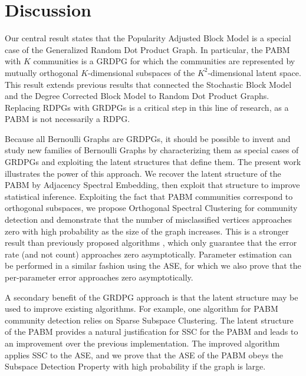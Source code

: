 \documentclass[12pt]{article}
\begin{document}
\hypertarget{discussion}{%
\section{Discussion}\label{discussion}}

Our central result states that the Popularity Adjusted Block Model 
is a special case of the Generalized Random Dot Product Graph. 
In particular, the PABM with $K$ communities is a GRDPG 
for which the communities are represented by 
mutually orthogonal $K$-dimensional subspaces 
of the $K^2$-dimensional latent space. 
This result extends previous results that connected 
the Stochastic Block Model and the Degree Corrected Block Model 
to Random Dot Product Graphs. 
Replacing RDPGs with GRDPGs is a critical step in this line of research, 
as a PABM is not necessarily a RDPG. 

Because all Bernoulli Graphs are GRDPGs, it should be possible to
invent and study new families of Bernoulli Graphs by characterizing
them as special cases of GRDPGs and exploiting the latent structures
that define them.  The present work illustrates the power of this
approach.  We recover the latent structure of the PABM by Adjacency
Spectral Embedding, then exploit that structure to improve statistical
inference.  Exploiting the fact that PABM communities correspond to
orthogonal subspaces, we propose Orthogonal Spectral Clustering for
community detection and demonstrate that the number of misclassified
vertices approaches zero with high probability as the size of the
graph increases.  This is a stronger result than previously proposed
algorithms \citep{307cbeb9b1be48299388437423d94bf1}, which only
guarantee that the error rate (and not count) approaches zero
asymptotically.  Parameter estimation can be performed in a similar
fashion using the ASE, for which we also prove that the per-parameter
error approaches zero asymptotically.

A secondary benefit of the GRDPG approach is that the latent structure
may be used to improve existing algorithms.  For example, one
algorithm for PABM community detection \citep{noroozi2019estimation}
relies on Sparse Subspace Clustering.  The latent structure of the
PABM provides a natural justification for SSC for the PABM and leads
to an improvement over the previous implementation.  The improved
algorithm applies SSC to the ASE, and we prove that the ASE of the
PABM obeys the Subspace Detection Property with high probability if
the graph is large.
\end{document}
